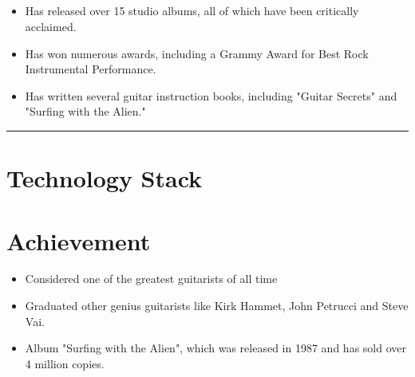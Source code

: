 \documentclass[12pt]{../templates/classes/res}
\begin{document}
\begin{resume}
\begin{multicols}{2}
  \section{}
    \begin{itemize}
      \setlength{\itemindent}{0pt}
      \item Has released over 15 studio albums, all of which have been critically acclaimed.
\item Has won numerous awards, including a Grammy Award for Best Rock Instrumental Performance.
\item Has written several guitar instruction books, including "Guitar Secrets" and "Surfing with the Alien."
    \end{itemize}
\end{multicols}

\vspace{-20pt}
\begin{minipage}[t]{0.55\linewidth}
  \rule{0.25\textwidth}{2pt}
  \begin{multicols}{2}
    \section{Technology Stack}
    \columnbreak
    \section{}
  \end{multicols}
  \vspace{1pt}
\end{minipage}
\hfill
\begin{minipage}[t]{0.42\linewidth}
  \vspace{18pt}
  \section{Achievement}
  \begin{flushleft}
        \footnotesize{\begin{itemize}
\item Considered one of the greatest guitarists of all time
\item Graduated other genius guitarists like Kirk Hammet, John Petrucci and Steve Vai.
\item Album "Surfing with the Alien", which was released in 1987 and has sold over 4 million copies.
\end{itemize}}
  \end{flushleft}
\end{minipage}


\end{resume}
\end{document}
